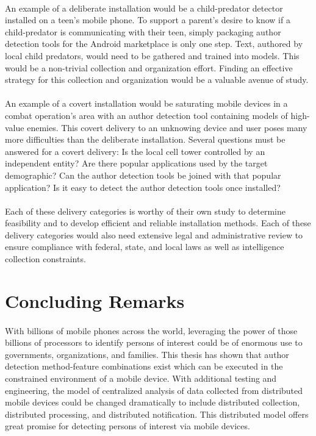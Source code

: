 			\paragraph*{}An example of a deliberate installation would be a child-predator detector installed on a teen's mobile phone. To support a parent's desire to know if a child-predator is communicating with their teen, simply packaging author detection tools for the Android marketplace is only one step.  Text, authored by local child predators, would need to be gathered and trained into models.  This would be a non-trivial collection and organization effort. Finding an effective strategy for this collection and organization would be a valuable avenue of study.
			\paragraph*{} An example of a covert installation would be saturating mobile devices in a combat operation's area with an author detection tool containing models of high-value enemies. This covert delivery to an unknowing device and user poses many more difficulties than the deliberate installation. Several questions must be answered for a covert delivery:  Is the local cell tower controlled by an independent entity?  Are there popular applications used by the target demographic?  Can the author detection tools be joined with that popular application?  Is it easy to detect the author detection tools once installed?
			\paragraph*{} Each of these delivery categories is worthy of their own study to determine feasibility and to develop efficient and reliable installation methods.  Each of these delivery categories would also need extensive legal and administrative review to ensure compliance with federal, state, and local laws as well as intelligence collection constraints.

\section{Concluding Remarks}
\paragraph*{} With billions of mobile phones across the world, leveraging the power of those billions of processors to identify persons of interest could be of enormous use to governments, organizations, and families.  This thesis has shown that author detection method-feature combinations exist which can be executed in the constrained environment of a mobile device.  With additional testing and engineering, the model of centralized analysis of data collected from distributed mobile devices could be changed dramatically to include distributed collection, distributed processing, and distributed notification.  This distributed model offers great promise for detecting persons of interest via mobile devices.

